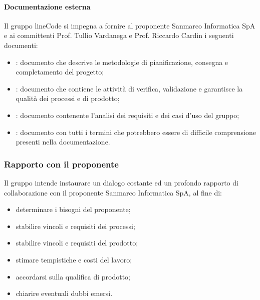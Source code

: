 		\paragraph{Documentazione esterna}
		Il gruppo lineCode si impegna a fornire al proponente Sanmarco Informatica SpA e ai committenti Prof. Tullio Vardanega e Prof. Riccardo Cardin i seguenti documenti:
		\begin{itemize}
		 	\item {}: documento che descrive le metodologie di pianificazione, consegna e completamento del progetto;
		 	\item {}: documento che contiene le attività di verifica, validazione e garantisce la qualità dei processi e di prodotto;
		 	\item {}: documento contenente l'analisi dei requisiti e dei casi d'uso del gruppo;
		 	\item {}: documento con tutti i termini che potrebbero essere di difficile comprensione presenti nella documentazione.
		\end{itemize}

	\subsubsection{Rapporto con il proponente}
	Il gruppo intende instaurare un dialogo costante ed un profondo rapporto di collaborazione con il proponente Sanmarco Informatica SpA, al fine di:
	\begin{itemize}
		\item determinare i bisogni del proponente;
		\item stabilire vincoli e requisiti dei processi;
		\item stabilire vincoli e requisiti del prodotto;
		\item stimare tempistiche e costi del lavoro;
		\item accordarsi sulla qualifica di prodotto;
		\item chiarire eventuali dubbi emersi.
	\end{itemize}